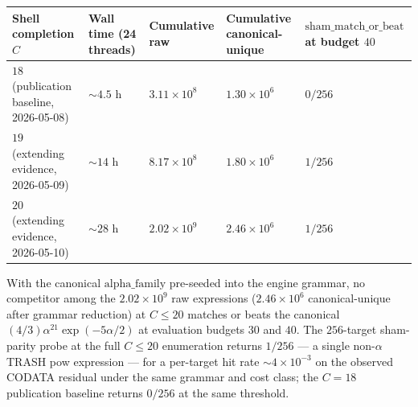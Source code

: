 \documentclass[
  11pt,
  letterpaper,
  twocolumn,
]{article}
\begin{document}
\begin{table}[!htb]
\centering\small
\begin{tabular}{@{}
  >{\raggedright\arraybackslash}p{}
  >{\raggedright\arraybackslash}p{}
  >{\raggedright\arraybackslash}p{}
  >{\raggedright\arraybackslash}p{}
  >{\raggedright\arraybackslash}p{}@{}}
\toprule
\begin{minipage}[b]{\linewidth}\raggedright
Shell completion \(C\)
\end{minipage} & \begin{minipage}[b]{\linewidth}\raggedright
Wall time (24 threads)
\end{minipage} & \begin{minipage}[b]{\linewidth}\raggedright
Cumulative raw
\end{minipage} & \begin{minipage}[b]{\linewidth}\raggedright
Cumulative canonical-unique
\end{minipage} & \begin{minipage}[b]{\linewidth}\raggedright
\(\mathrm{sham\_match\_or\_beat}\) at budget \(40\)
\end{minipage} \\
\midrule
\(18\) (publication baseline, 2026-05-08) & \(\sim\!4.5\) h &
\(3.11\!\times\!10^8\) & \(1.30\!\times\!10^6\) & \(0/256\) \\
\(19\) (extending evidence, 2026-05-09) & \(\sim\!14\) h &
\(8.17\!\times\!10^8\) & \(1.80\!\times\!10^6\) & \(1/256\) \\
\(20\) (extending evidence, 2026-05-10) & \(\sim\!28\) h &
\(2.02\!\times\!10^9\) & \(2.46\!\times\!10^6\) & \(1/256\) \\
\bottomrule
\end{tabular}
\end{table}

With the canonical \(\mathrm{alpha\_family}\) pre-seeded into the engine
grammar, no competitor among the \(2.02\!\times\!10^9\) raw expressions
(\(2.46\!\times\!10^6\) canonical-unique after grammar reduction) at
\(C\!\le\!20\) matches or beats the canonical
\((4/3)\alpha^{21}\exp(-5\alpha/2)\) at evaluation budgets \(30\) and
\(40\). The \(256\)-target sham-parity probe at the full \(C\!\le\!20\)
enumeration returns \(1/256\) --- a single non-\(\alpha\) TRASH pow
expression --- for a per-target hit rate \(\sim\!4\!\times\!10^{-3}\) on
the observed CODATA residual under the same grammar and cost class; the
\(C\!=\!18\) publication baseline returns \(0/256\) at the same
threshold.
\end{document}
